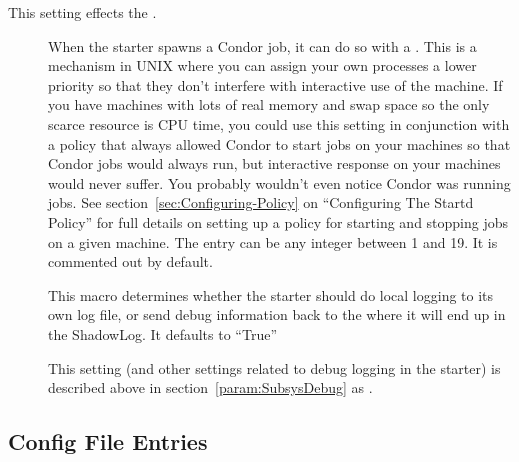 This setting effects the .
\begin{description}

\item[] \label{param:JobReniceIncrement}
  When the starter spawns a Condor job, it can do so with a
  .  This is a mechanism in UNIX where you can assign
  your own processes a lower priority so that they don't interfere
  with interactive use of the machine.  If you have machines with lots
  of real memory and swap space so the only scarce resource is CPU
  time, you could use this setting in conjunction with a policy that
  always allowed Condor to start jobs on your machines so that Condor
  jobs would always run, but interactive response on your machines
  would never suffer.  You probably wouldn't even notice Condor was
  running jobs.  See section~\ref{sec:Configuring-Policy} on
  ``Configuring The Startd Policy'' for full details on setting up a
  policy for starting and stopping jobs on a given machine.  The entry
  can be any integer between 1 and 19.  It is commented out by
  default.

\item[]
  \label{param:StarterLocalLogging} This macro determines whether the
  starter should do local logging to its own log file, or send debug
  information back to the  where it will end up in the
  ShadowLog.  It defaults to ``True''

\item[] \label{param:StarterDebug} This setting
  (and other settings related to debug logging in the starter) is
  described above in section~\ref{param:SubsysDebug} as
  .

\end{description}

\subsection{\label{sec:Submit-Config-File-Entries}
 Config File Entries}

